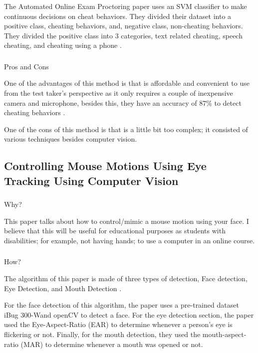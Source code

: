 \documentclass[conference]{IEEEtran}
\begin{document}
The Automated Online Exam Proctoring paper uses an SVM classifier to make continuous decisions on cheat behaviors. They divided their dataset into a positive class, cheating behaviors, and, negative class, non-cheating behaviors. They divided the positive class into 3 categories, text related cheating, speech cheating, and cheating using a phone \cite{b3}. 

\subsubsection{}Pros and Cons 

One of the advantages of this method is that is affordable and convenient to use from the test taker’s perspective as it only requires a couple of inexpensive camera and microphone, besides this, they have an accuracy of 87\% to detect cheating behaviors \cite{b3}.

One of the cons of this method is that is a little bit too complex; it consisted of various techniques besides computer vision.


\subsection{Controlling Mouse Motions Using Eye Tracking Using Computer Vision}
\subsubsection{}Why?

This paper talks about how to control/mimic a mouse motion using your face. I believe that this will be useful for educational purposes as students with disabilities; for example, not having hands; to use a computer in an online course.

\subsubsection{}How? 

The algorithm of this paper is made of three types of detection, Face detection, Eye Detection, and Mouth Detection \cite{b5}. 

For the face detection of this algorithm, the paper uses a pre-trained dataset iBug 300-Wand openCV to detect a face. For the eye detection section, the paper used the Eye-Aspect-Ratio (EAR) to determine whenever a person’s eye is flickering or not. Finally, for the mouth detection, they used the mouth-aspect-ratio (MAR) to determine whenever a mouth was opened or not.
\end{document}
